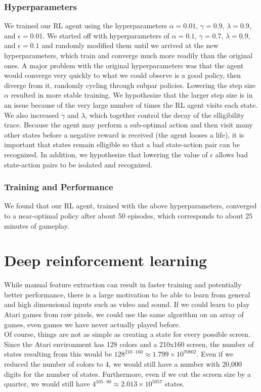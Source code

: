 \documentclass{article}
\begin{document}
\subsubsection{Hyperparameters}
We trained our RL agent using the hyperparameters $\alpha = 0.01$, $\gamma = 0.9$, $\lambda = 0.9$, and $\epsilon = 0.01$.  We started off with hyperparameters of $\alpha = 0.1$, $\gamma = 0.7$, $\lambda = 0.9$, and $\epsilon = 0.1$ and randomly modified them until we arrived at the new hyperparameters, which train and converge much more readily than the original ones.  A major problem with the original hyperparameters was that the agent would converge very quickly to what we could observe is a good policy, then diverge from it, randomly cycling through subpar policies.  Lowering the step size $\alpha$ resulted in more stable training.  We hypothesize that the larger step size is in an issue because of the very large number of times the RL agent visits each state.  We also increased $\gamma$ and $\lambda$, which together control the decay of the elligibility trace.  Because the agent may perform a sub-optimal action and then visit many other states before a negative reward is received (the agent looses a life), it is important that states remain elligible so that a bad state-action pair can be recognized.  In addition, we hypothesize that lowering the value of $\epsilon$ allows bad state-action pairs to be isolated and recognized.
\subsubsection{Training and Performance}
We found that our RL agent, trained with the above hyperparameters, converged to a near-optimal policy after about 50 episodes, which corresponds to about 25 minutes of gameplay.

\section{Deep reinforcement learning}
  While manual feature extraction can result in faster training and potentially better performance, there is a large motivation to be able to learn from general and high dimensional inputs such as video and sound. If we could learn to play Atari games from raw pixels, we could use the same algorithm on an array of games, even games we have never actually played before. \\

  Of course, things are not as simple as creating a state for every possible screen. Since the Atari environment has 128 colors and a 210x160 screen, the number of states resulting from this would be $128^{210 \cdot 160} \approx 1.799\times 10^{70802}$. Even if we reduced the number of colors to 4, we would still have a number with 20,000 digits for the number of states. Furthermore, even if we cut the screen size by a quarter, we would still have $4^{105 \cdot 80} \approx 2.013\times 10^{5057}$ states. \\
\end{document}
